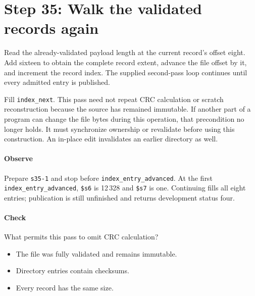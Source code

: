 \section{Step 35: Walk the validated records again}
Read the already-validated payload length at the current record's offset
eight. Add sixteen to obtain the complete record extent, advance the file
offset by it, and increment the record index. The supplied second-pass loop
continues until every admitted entry is published.

Fill \texttt{index\_next}. This pass need not repeat CRC calculation or scratch
reconstruction because the source has remained immutable. If another part of a
program can change the file bytes during this operation, that precondition no
longer holds. It must synchronize ownership or revalidate before using this
construction. An in-place edit invalidates an earlier directory as well.

\paragraph{Observe} Prepare \texttt{s35-1} and stop before
\texttt{index\_entry\_advanced}. At the first \texttt{index\_entry\_advanced},
\texttt{\$s6} is 12\,328 and \texttt{\$s7} is one. Continuing fills all
eight entries; publication is still unfinished and returns development status four.

\paragraph{Check} What permits this pass to omit CRC calculation?
\begin{itemize}
  \item[A.] The file was fully validated and remains immutable.
  \item[B.] Directory entries contain checksums.
  \item[C.] Every record has the same size.
\end{itemize}
